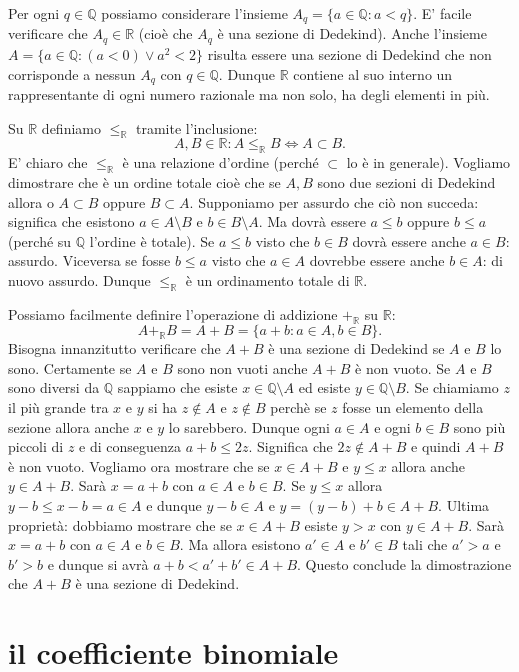 \documentclass[italian,a4paper,hidelinks,headinclude]{scrartcl}
\newcommand{\QQ}{{\mathbb Q}}
\newcommand{\RR}{{\mathbb R}}
\begin{document}
Per ogni $q\in \QQ$ possiamo considerare l'insieme $A_q = \{a\in \QQ\colon a<q\}$.
E' facile verificare che $A_q\in \RR$ (cioè che $A_q$ è una sezione di Dedekind).
Anche l'insieme $A= \{a\in \QQ \colon (a<0) \lor a^2<2\}$ risulta essere una
sezione di Dedekind che non corrisponde
a nessun $A_q$ con $q\in \QQ$.
Dunque $\RR$ contiene al suo interno un rappresentante di ogni numero razionale
ma non solo, ha degli elementi in più.

Su $\RR$ definiamo $\le_\RR$ tramite l'inclusione:
\[
  A,B\in \RR: A \le_\RR B \iff A \subset B.
\]
E' chiaro che $\le_\RR$ è una relazione d'ordine
(perché $\subset$ lo è in generale).
Vogliamo dimostrare che è un ordine totale cioè che
se $A,B$ sono due sezioni di Dedekind allora o $A\subset B$
oppure $B\subset A$. Supponiamo per assurdo che ciò non succeda:
significa che esistono $a\in A\setminus B$ e $b\in B\setminus A$.
Ma dovrà essere $a\le b$ oppure $b\le a$ (perché su $\QQ$ l'ordine è totale).
Se $a\le b$ visto che $b\in B$ dovrà essere anche $a\in B$: assurdo.
Viceversa se fosse $b\le a$ visto che $a\in A$ dovrebbe essere anche $b\in A$:
di nuovo assurdo. Dunque $\le_\RR$ è un ordinamento totale di $\RR$.

Possiamo facilmente definire l'operazione di addizione $+_\RR$ su $\RR$:
\[
A +_\RR B = A+B = \{a+b\colon a \in A, b\in B\}.
\]
Bisogna innanzitutto
verificare che $A+B$ è una sezione di Dedekind se $A$  e $B$ lo sono. Certamente
se $A$ e $B$ sono non vuoti anche $A+B$ è non vuoto. Se $A$ e $B$ sono diversi
da $\QQ$ sappiamo che esiste $x\in \QQ \setminus A$ ed esiste $y \in \QQ
\setminus B$. Se chiamiamo $z$ il più grande tra $x$ e $y$  si ha $z\not \in A$
e $z\not \in B$ perchè se $z$ fosse un elemento della sezione  allora anche $x$
e $y$ lo sarebbero. Dunque ogni $a\in A$ e ogni $b\in B$ sono  più piccoli di
$z$ e di conseguenza $a+b \le 2z$. Significa che $2z\not \in A+B$ e quindi $A+B$
è non vuoto. Vogliamo ora mostrare che se $x \in A+B$ e $y\le x$  allora anche
$y\in A+B$. Sarà $x=a+b$ con $a\in A$ e $b\in B$. Se $y\le x$ allora  $y-b \le
x-b = a\in A$ e dunque $y-b \in A$ e $y = (y-b) + b \in A+B$. Ultima proprietà:
dobbiamo mostrare che se $x\in A+B$ esiste $y>x$ con $y\in A+B$. Sarà $x=a+b$
con $a\in A$ e $b\in B$. Ma allora esistono $a'\in A$ e $b'\in B$  tali che
$a'>a$ e $b'>b$ e dunque si avrà $a+b < a'+b' \in A+B$. Questo conclude la
dimostrazione che $A+B$ è una sezione di Dedekind.

\section{il coefficiente binomiale}
\end{document}

